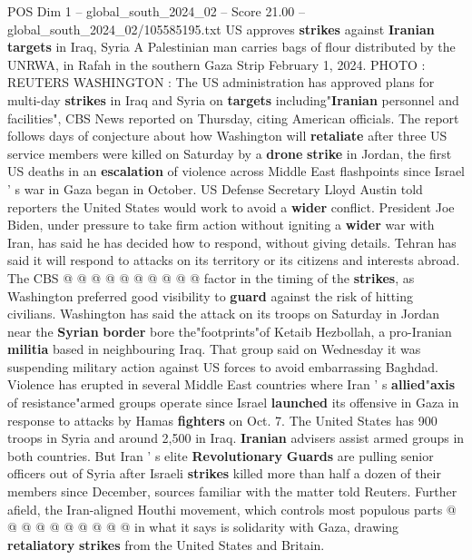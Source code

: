 \begin{textsample}{POS Dim 1 – global\_south\_2024\_02 – Score 21.00 – global\_south\_2024\_02/105585195.txt}  \label{ex:f1_pos_201}
US approves \textbf{strikes} against \textbf{Iranian} \textbf{targets} in Iraq, Syria A Palestinian man carries bags of flour distributed by the UNRWA, in Rafah in the southern Gaza Strip February 1, 2024.
PHOTO : REUTERS WASHINGTON : The US administration has approved plans for multi-day \textbf{strikes} in Iraq and Syria on \textbf{targets} including"\textbf{Iranian} personnel and facilities", CBS News reported on Thursday, citing American officials.
The report follows days of conjecture about how Washington will \textbf{retaliate} after three US service members were killed on Saturday by a \textbf{drone} \textbf{strike} in Jordan, the first US deaths in an \textbf{escalation} of violence across Middle East flashpoints since Israel ' s war in Gaza began in October.
US Defense Secretary Lloyd Austin told reporters the United States would work to avoid a \textbf{wider} conflict.
President Joe Biden, under pressure to take firm action without igniting a \textbf{wider} war with Iran, has said he has decided how to respond, without giving details.
Tehran has said it will respond to attacks on its territory or its citizens and interests abroad.
The CBS @ @ @ @ @ @ @ @ @ @ factor in the timing of the \textbf{strikes}, as Washington preferred good visibility to \textbf{guard} against the risk of hitting civilians.
Washington has said the attack on its troops on Saturday in Jordan near the \textbf{Syrian} \textbf{border} bore the"footprints"of Ketaib Hezbollah, a pro-Iranian \textbf{militia} based in neighbouring Iraq.
That group said on Wednesday it was suspending military action against US forces to avoid embarrassing Baghdad.
Violence has erupted in several Middle East countries where Iran ' s \textbf{allied}"\textbf{axis} of resistance"armed groups operate since Israel \textbf{launched} its offensive in Gaza in response to attacks by Hamas \textbf{fighters} on Oct. 7.
The United States has 900 troops in Syria and around 2,500 in Iraq. \textbf{Iranian} advisers assist armed groups in both countries.
But Iran ' s elite \textbf{Revolutionary} \textbf{Guards} are pulling senior officers out of Syria after Israeli \textbf{strikes} killed more than half a dozen of their members since December, sources familiar with the matter told Reuters.
Further afield, the Iran-aligned Houthi movement, which controls most populous parts @ @ @ @ @ @ @ @ @ @ in what it says is solidarity with Gaza, drawing \textbf{retaliatory} \textbf{strikes} from the United States and Britain.

\end{textsample}
